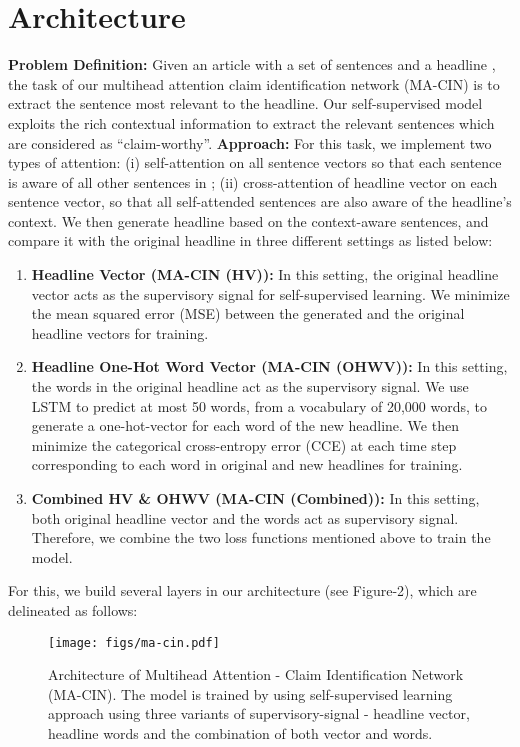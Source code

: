 \documentclass[11pt,a4paper]{article}
\begin{document}
\section{Architecture}
\label{sec:model}
\textbf{Problem Definition:} Given an article with a set of sentences  and a headline , the task of our multihead attention claim identification network (MA-CIN) is to extract the sentence most relevant to the headline. Our self-supervised model exploits the rich contextual information to extract the relevant sentences which are considered as ``claim-worthy''. \newline
\textbf{Approach:} For this task, we implement two types of attention: (i) self-attention on all sentence vectors so that each sentence  is aware of all other sentences in ; (ii) cross-attention of headline vector on each sentence vector, so that all self-attended sentences are also aware of the headline's context. We then generate headline based on the context-aware sentences, and compare it with the original headline in three different settings as listed below:
\begin{enumerate}[nolistsep]
\item{\textbf{Headline Vector (MA-CIN (HV)):}} In this setting, the original headline vector acts as the supervisory signal for self-supervised learning. We minimize the mean squared error (MSE) between the generated and the original headline vectors for training.
\item{\textbf{Headline One-Hot Word Vector (MA-CIN (OHWV)):}} In this setting, the words in the original headline act as the supervisory signal. We use LSTM \cite{doi:10.1162/neco.1997.9.8.1735} to predict at most 50 words, from a vocabulary of 20,000 words, to generate a one-hot-vector for each word of the new headline. We then minimize the categorical cross-entropy error (CCE) at each time step corresponding to each word in original and new headlines for training.
\item{\textbf{Combined HV \& OHWV (MA-CIN (Combined)):}} In this setting, both original headline vector and the words act as supervisory signal. Therefore, we combine the two loss functions mentioned above to train the model.
\end{enumerate}
For this, we build several layers in our architecture (see Figure-2), which are delineated as follows:
\begin{figure*}[ht]
\begin{center}
\texttt{[image: figs/ma-cin.pdf]}
\caption{\label{fig:architecture}Architecture of Multihead Attention - Claim Identification Network (MA-CIN). The model is trained by using self-supervised learning approach using three variants of supervisory-signal - headline vector, headline words and the combination of both vector and words.}
\end{center}
\end{figure*}
\end{document}
